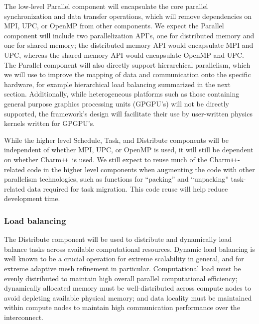\documentclass[11pt,letterpaper]{article}
\newcommand{\pp}{\texttt{++}}
\newcommand{\charm}{\textsf{Charm\pp}}
\newcommand{\code}[1]{\textsf{#1}}
\begin{document}
The low-level \code{Parallel} component will encapsulate the core
parallel synchronization and data transfer operations, which will
remove dependencies on MPI, UPC, or OpenMP from other components.  We
expect the \code{Parallel} component will include two parallelization
API's, one for distributed memory and one for shared memory; the
distributed memory API would encapsulate MPI and UPC, whereas the
shared memory API would encapsulate OpenMP and UPC.  The
\code{Parallel} component will also directly support hierarchical
parallelism, which we will use to improve the mapping of data and
communication onto the specific hardware, for example hierarchical
load balancing summarized in the next section.  Additionally, while
heterogeneous platforms such as those containing general purpose
graphics processing units (GPGPU's) will not be directly supported,
the framework's design will facilitate their use by user-written
physics kernels written for GPGPU's.

While the higher level \code{Schedule}, \code{Task}, and
\code{Distribute} components will be independent of whether MPI, UPC,
or OpenMP is used, it will still be dependent on whether \charm\ is
used.  We still expect to reuse much of the \charm-related code in the
higher level components when augmenting the code with other
parallelism technologies, such as functions for ``packing'' and
``unpacking'' task-related data required for task migration.  This
code reuse will help reduce development time.

\subsubsection{Load balancing} \label{sss:design-balance}

The \code{Distribute} component will be used to distribute and
dynamically load balance tasks across available computational
resources.  Dynamic load balancing is well known to be a crucial
operation for extreme scalability in general, and for extreme adaptive
mesh refinement in particular.  Computational load must be evenly
distributed to maintain high overall parallel computational
efficiency; dynamically allocated memory must be well-distributed
across compute nodes to avoid depleting available physical memory; and
data locality must be maintained within compute nodes to maintain high
communication performance over the interconnect.
\end{document}
